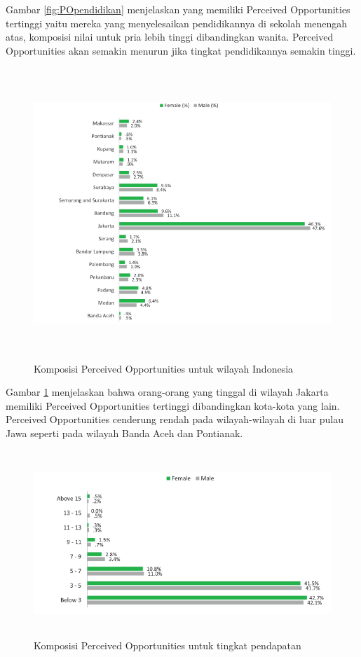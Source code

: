 \begin{enumerate}
Gambar \ref{fig:POpendidikan} menjelaskan yang memiliki Perceived Opportunities tertinggi yaitu mereka yang menyelesaikan pendidikannya di sekolah menengah atas, komposisi nilai untuk pria lebih tinggi dibandingkan wanita. Perceived Opportunities akan semakin menurun jika tingkat pendidikannya semakin tinggi.

\begin{figure} [H]
	\centering  
	\includegraphics[width=15cm, height=11cm]{lokasiPO2013} 
	\caption[Komposisi Perceived Opportunities untuk wilayah Indonesia]{Komposisi Perceived Opportunities untuk wilayah Indonesia} 
	\label{fig:lokasiPO} 
\end{figure}  

Gambar \ref{fig:lokasiPO} menjelaskan bahwa orang-orang yang tinggal di wilayah Jakarta memiliki Perceived Opportunities tertinggi dibandingkan kota-kota yang lain. Perceived Opportunities cenderung rendah pada wilayah-wilayah di luar pulau Jawa seperti pada wilayah Banda Aceh dan Pontianak.

\begin{figure} [H]
	\centering  
	\includegraphics[width=14cm, height=7cm]{pendapatanPO2013} 
	\caption[Komposisi Perceived Opportunities untuk tingkat pendapatan]{Komposisi Perceived Opportunities untuk tingkat pendapatan} 
	\label{fig:pendapatanPO} 
\end{figure} 


\end{enumerate}
